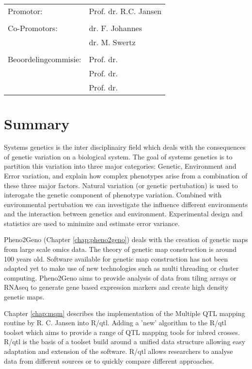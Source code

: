 \documentclass[8pt, twoside]{book}
\begin{document}
\newpage
\thispagestyle{empty}
\begin{tabular}{ l l }
Promotor:             & Prof. dr. R.C. Jansen \\
                      & \\
Co-Promotors:         & dr. F. Johannes \\
                      & dr. M. Swertz \\
                      & \\
Beoordelingcommisie:  & Prof. dr. \\
                      & Prof. dr. \\
                      & Prof. dr. \\
\end{tabular}
\tableofcontents

\newpage
\thispagestyle{empty}
\chapter*{Summary}\vspace{-30pt}
Systems genetics is the inter disciplinairy field which deals with the consequences of genetic 
variation on a biological system. The goal of systems genetics is to partition this variation 
into three major categories: Genetic, Environment and Error variation, and explain how complex
phenotypes arise from a combination of these three major factors.  Natural variation (or 
genetic pertubation) is used to interogate the genetic component of phenotype variation. 
Combined with environmental pertubation we can investigate the influence different 
environments and the interaction between genetics and environment. Experimental design and 
statistics are used to minimize and estimate error variance.

Pheno2Geno (Chapter \ref{chap:pheno2geno}) deals with the creation of genetic maps from 
large scale omics data. The theory of genetic map construction is around 100 years old. 
Software available for genetic map construction has not been adapted yet to make use of 
new technologies such as multi threading or cluster computing. Pheno2Geno aims to 
provide analysis of data from tiling arrays or RNAseq to generate gene based expression 
markers and create high density genetic maps.

Chapter \ref{chap:mqm} describes the implementation of the Multiple QTL mapping routine 
by R. C. Jansen into R/qtl. Adding a 'new' algorithm to the R/qtl toolset which aims to 
provide a range of QTL mapping tools for inbred crosses. R/qtl is the basis of a toolset 
build around a unified data structure allowing easy adaptation and extension of the software. 
R/qtl allows researchers to analyse data from different sources or to quickly compare 
different approaches.
\end{document}
